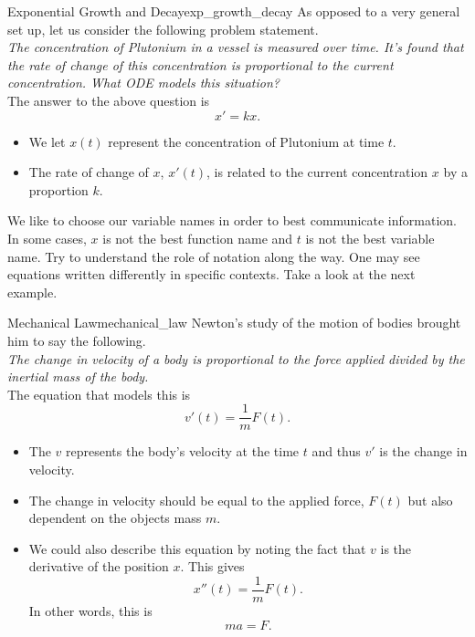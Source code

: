         \begin{ex}{Exponential Growth and Decay}{exp_growth_decay}
        As opposed to a very general set up, let us consider the following problem statement.\\
        
        \emph{The concentration of Plutonium in a vessel is measured over time.  It's found that the rate of change of this concentration is proportional to the current concentration.  What ODE models this situation?}\\
        
        The answer to the above question is
        \[
        x'=kx.
        \]
        \begin{itemize}
            \item We let $x(t)$ represent the concentration of Plutonium at time $t$.
            \item The rate of change of $x$, $x'(t)$, is related to the current concentration $x$ by a proportion $k$.
        \end{itemize}
        \end{ex}
        
        We like to choose our variable names in order to best communicate information.  In some cases, $x$ is not the best function name and $t$ is not the best variable name.  Try to understand the role of notation along the way.  One may see equations written differently in specific contexts. Take a look at the next example. 
        
        \begin{ex}{Mechanical Law}{mechanical_law}
        Newton's study of the motion of bodies brought him to say the following.\\
        
        \emph{The change in velocity of a body is proportional to the force applied divided by the inertial mass of the body.}\\
        
        The equation that models this is
        \[
        v'(t)=\frac{1}{m} F(t).
        \]
        \begin{itemize}
            \item The $v$ represents the body's velocity at the time $t$ and thus $v'$ is the change in velocity.
            \item The change in velocity should be equal to the applied force, $F(t)$ but also dependent on the objects mass $m$.
            \item We could also describe this equation by noting the fact that $v$ is the derivative of the position $x$. This gives
            \[
            x''(t)=\frac{1}{m}F(t).
            \]
            In other words, this is
            \[
            ma=F.
            \]
        \end{itemize}
        \end{ex}
        
